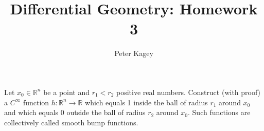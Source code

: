 \documentclass{article}
\newenvironment{problem}[2][Problem]{\begin{trivlist}
\item[\hskip \labelsep {\bfseries #1}\hskip \labelsep {\bfseries #2.}]}{\end{trivlist}}
\begin{document}
\title{Differential Geometry: Homework 3}
\author{Peter Kagey}

\maketitle

\begin{problem}{1}
  Let $x_0 \in \mathbb{R}^n$ be a point and $r_1 < r_2$ positive real numbers.
  Construct (with proof) a $C^\infty$ function
  $h\colon \mathbb{R}^n \rightarrow \mathbb{R}$ which equals 1 inside the ball
  of radius $r_1$ around $x_0$ and which equals $0$ outside the ball of radius
  $r_2$ around $x_0$. Such functions are collectively called smooth bump
  functions.
\end{problem}
\end{document}
